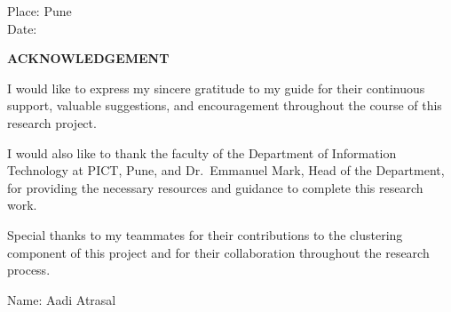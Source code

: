 \documentclass[12pt,a4paper]{report}
\begin{document}
\vspace{0.8in}

\noindent
Place: Pune\\
Date:

\newpage
\thispagestyle{empty}
\mbox{}
\newpage

\newpage
\thispagestyle{empty}

\begin{center}
\vspace{0.3in}
\textbf{\Large ACKNOWLEDGEMENT}
\end{center}

\vspace{0.4in}

\noindent
I would like to express my sincere gratitude to my guide for their continuous support, valuable suggestions, and encouragement throughout the course of this research project.

\vspace{0.2in}

\noindent
I would also like to thank the faculty of the Department of Information Technology at PICT, Pune, and Dr.\ Emmanuel Mark, Head of the Department, for providing the necessary resources and guidance to complete this research work.

\vspace{0.2in}

\noindent
Special thanks to my teammates for their contributions to the clustering component of this project and for their collaboration throughout the research process.

\vspace{2in}

\begin{flushright}
Name: Aadi Atrasal\\
\end{flushright}
\end{document}
